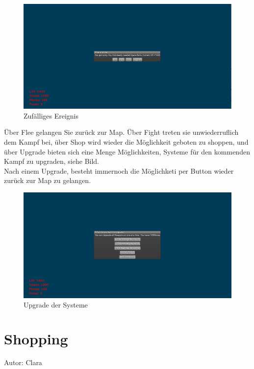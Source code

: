 \documentclass[fontsize=12pt,paper=a4,twoside]{scrartcl}
\begin{document}
\begin{figure}[htp]
	\centering
	\includegraphics[width=1.00\linewidth]{pics/randomEreignis.png}
	\caption{Zufälliges Ereignis}
	\label{fig1}
\end{figure}

Über Flee gelangen Sie zurück zur Map. Über Fight treten sie unwiederruflich dem Kampf bei, über Shop wird wieder die Möglichkeit geboten zu shoppen, und über Upgrade bieten sich eine Menge Möglichkeiten, Systeme für den kommenden Kampf zu upgraden, siehe Bild.\\
Nach einem Upgrade, besteht immernoch die Möglichketi per Button wieder zurück zur Map zu gelangen.


\begin{figure}[htp]
	\centering
	\includegraphics[width=1.00\linewidth]{pics/upgrade.png}
	\caption{Upgrade der Systeme}
	\label{fig1}
\end{figure}

\section{Shopping}
Autor: Clara\\
\end{document}
